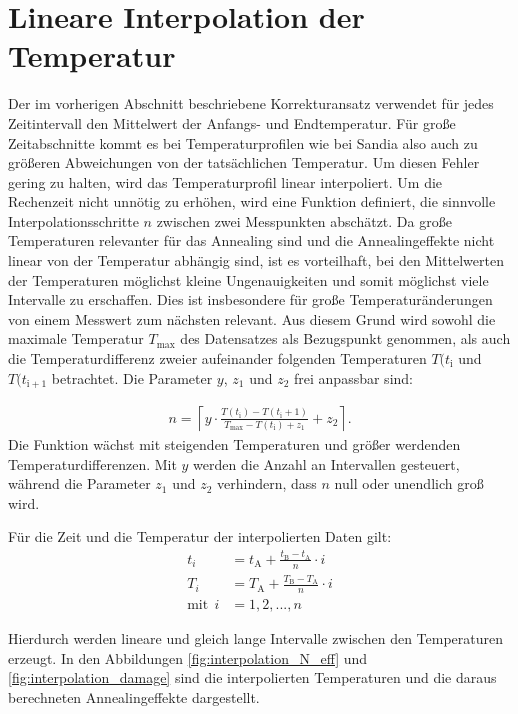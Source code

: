\section{Lineare Interpolation der Temperatur}
Der im vorherigen Abschnitt beschriebene Korrekturansatz verwendet für jedes
Zeitintervall den Mittelwert der Anfangs- und Endtemperatur. Für große
Zeitabschnitte kommt es bei Temperaturprofilen wie bei Sandia also auch zu größeren Abweichungen von der tatsächlichen
Temperatur. Um diesen Fehler gering zu halten, wird das Temperaturprofil
linear interpoliert.
Um die Rechenzeit nicht unnötig zu erhöhen, wird eine Funktion definiert, die sinnvolle
Interpolationsschritte $n$ zwischen zwei Messpunkten abschätzt.
Da große Temperaturen relevanter für das Annealing sind und die Annealingeffekte nicht linear von
der Temperatur abhängig sind, ist es vorteilhaft,
bei den Mittelwerten der Temperaturen möglichst kleine Ungenauigkeiten und somit möglichst viele
Intervalle zu erschaffen. Dies ist insbesondere für große Temperaturänderungen von einem Messwert zum nächsten relevant.
Aus diesem Grund wird sowohl die maximale Temperatur $T_{\mathrm{max}}$ des Datensatzes
als Bezugspunkt genommen, als auch die Temperaturdifferenz zweier
aufeinander folgenden Temperaturen $T(t_{\mathrm{i}}$ und $T(t_{\mathrm{i+1}}$  betrachtet. Die Parameter $y$, $z_1$
und $z_2$ frei anpassbar sind:

\begin{align*}
  n = \left\lceil{y \cdot \frac{T(t_{\mathrm{i}})-T(t_{\mathrm{i}}+1)}{T_{\mathrm{max}}-T(t_{\mathrm{i}})+ z_1}}+z_2\right\rceil \label{eqn:intervall} .
\end{align*}
Die Funktion wächst mit steigenden Temperaturen und größer werdenden Temperaturdifferenzen.
Mit $y$ werden die Anzahl an Intervallen gesteuert, während die
Parameter $z_1$ und $z_2$ verhindern, dass $n$ null oder unendlich groß wird.


Für die Zeit und die Temperatur der interpolierten Daten gilt:
\begin{align}
  t_i &= t_{\mathrm{A}} +  \frac{t_{\mathrm{B}}-t_{\mathrm{A}}}{n} \cdot i \\
  T_i &= T_{\mathrm{A}} +  \frac{T_{\mathrm{B}}-T_{\mathrm{A}}}{n} \cdot i \\
  \text{mit}\:\:i &= 1, 2, ..., n
\end{align}

Hierdurch werden lineare und gleich lange Intervalle zwischen den Temperaturen
erzeugt. In den Abbildungen \ref{fig:interpolation_N_eff} und \ref{fig:interpolation_damage} sind die interpolierten Temperaturen und
die daraus berechneten Annealingeffekte dargestellt.

